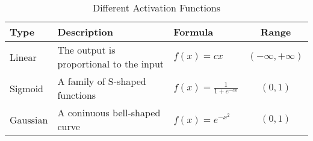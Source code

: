 \begin{table}
\centering
\caption{Different Activation Functions}
\begin{tabular}{lllc}
		\toprule
		Type & Description  & Formula & Range  \\
		\midrule
		Linear & The output is proportional to the input & $f(x)=cx$ &
		$(-\infty, +\infty)$ \\ 
		Sigmoid & A family of S-shaped functions& $f(x)=\frac{1}{1+e^{-cx}}$ &
		$(0, 1)$ \\ 
		Gaussian & A coninuous bell-shaped curve & $f(x)=e^{-x^2}$ & $(0,1)$ \\ 
		\bottomrule
	\end{tabular}
\end{table}
